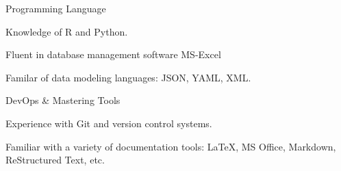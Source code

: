 \begin{cventries}
  \cventry
    {Programming Language}
    {}
    {}
    {}
    {
      \begin{cvitems}
        \item {Knowledge of R and Python.}
        \item {Fluent in database management software MS-Excel}
        \item {Familar of data modeling languages: JSON, YAML, XML.}
      \end{cvitems}
    }


    \cventry
    {DevOps \& Mastering Tools}
    {}
    {}
    {}
    {
      \begin{cvitems}
        \item {Experience with Git and version control systems.}
        \item {Familiar with a variety of documentation tools: \LaTeX{}, MS Office, Markdown, ReStructured Text, etc.}
      \end{cvitems}
    }
    
\end{cventries}
